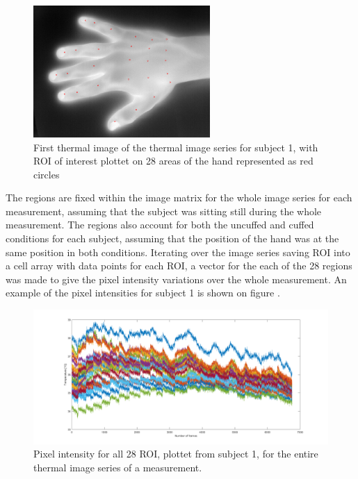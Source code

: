 \begin{figure}[H]
	\includegraphics[width=0.6\textwidth]{figures/roiHand}  %
	\caption{First thermal image of the thermal image series for subject 1, with ROI of interest plottet on 28 areas of the hand represented as red circles}
	\label{fig:roiHand}  %
\end{figure}

The regions are fixed within the image matrix for the whole image series for each measurement, assuming that the subject was sitting still during the whole measurement. The regions also account for both the uncuffed and cuffed conditions for each subject, assuming that the position of the hand was at the same position in both conditions. 
Iterating over the image series saving ROI into a cell array with data points for each ROI, a vector for the each of the 28 regions was made to give the pixel intensity variations over the whole measurement. 
An example of the pixel intensities for subject 1 is shown on figure .

\begin{figure}[H]
	\includegraphics[width=1.2\textwidth]{figures/Intensities}  %
	\caption{Pixel intensity for all 28 ROI, plottet from subject 1, for the entire thermal image series of a measurement.}
	\label{fig:Intensities}  %
\end{figure}

